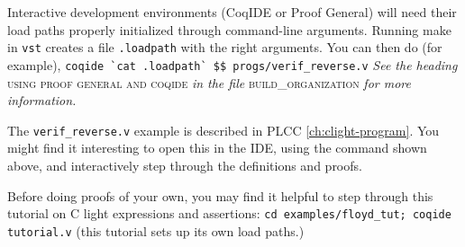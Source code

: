\documentclass[12pt,fleqn,openany,oneside,showtrims]{memoir}
\begin{document}
Interactive development environments (CoqIDE or Proof General)
will need their load paths properly initialized through
command-line arguments.  Running \textsf{make} in
\lstinline{vst} creates a file \lstinline{.loadpath} with
the right arguments.  You can then do (for example),
\newline
\lstinline{coqide `cat .loadpath` $$ progs/verif_reverse.v}
\newline
\emph{See the heading}
\textsc{using proof general and coqide}
\emph{in the file} \textsc{build\_organization}
\emph{for more information.}

The \lstinline{verif_reverse.v} example is described
in PLCC \autoref{ch:clight-program}.
You might find it interesting to open this in the IDE,
using the command shown above,
and interactively step through the definitions and proofs.

Before doing proofs of your own, you may find it helpful
to step through this tutorial on C light expressions and
assertions:\newline
\lstinline{cd examples/floyd_tut; coqide tutorial.v}\newline
(this tutorial sets up its own load paths.)
\end{document}
